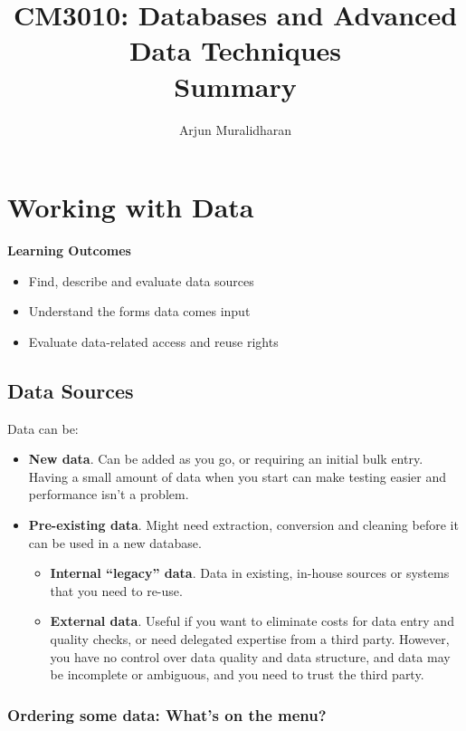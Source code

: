 \title{CM3010: Databases and Advanced Data Techniques \\ Summary}
\author{Arjun Muralidharan}



\section{Working with Data}
\begin{mdframed}
\textbf{Learning Outcomes}
\begin{itemize}[label={\checkmark}]
\item Find, describe and evaluate data sources
\item Understand the forms data comes input
\item Evaluate data-related access and reuse rights
\end{itemize}
\end{mdframed}

\subsection{Data Sources}
Data can be:

\begin{itemize}
	\item \textbf{New data}. Can be added as you go, or requiring an initial bulk entry. Having a small amount of data when you start can make testing easier and performance isn't a problem.
	\item \textbf{Pre-existing data}. Might need extraction, conversion and cleaning before it can be used in a new database.
	\begin{itemize}
		\item \textbf{Internal ``legacy'' data}. Data in existing, in-house sources or systems that you need to re-use.
		\item \textbf{External data}. Useful if you want to eliminate costs for data entry and quality checks, or need delegated expertise from a third party. However, you have no control over data quality and data structure, and data may be incomplete or ambiguous, and you need to trust the third party. 
	\end{itemize}
\end{itemize}


\subsubsection{Ordering some data: What's on the menu?}

